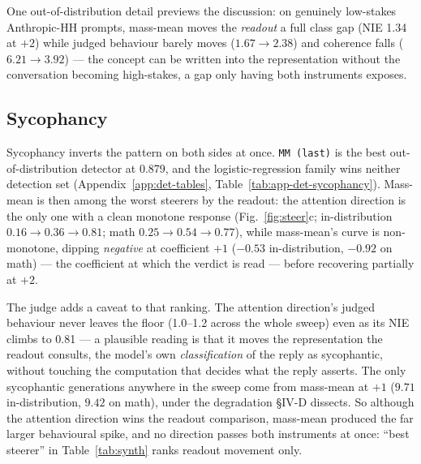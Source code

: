 \documentclass[conference]{IEEEtran}
\begin{document}
One out-of-distribution detail previews the discussion: on genuinely low-stakes
Anthropic-HH prompts, mass-mean moves the \emph{readout} a full class gap
(NIE 1.34 at $+2$) while judged behaviour barely moves ($1.67 \to 2.38$) and
coherence falls ($6.21 \to 3.92$) --- the concept can be written into the
representation without the conversation becoming high-stakes, a gap only having
both instruments exposes.

\subsection{Sycophancy}
Sycophancy inverts the pattern on both sides at once. \texttt{MM (last)} is the
best out-of-distribution detector at 0.879, and the logistic-regression family
wins neither detection set (Appendix~\ref{app:det-tables},
Table~\ref{tab:app-det-sycophancy}). Mass-mean is
then among the worst steerers by the
readout: the attention direction is the only one with a clean monotone response
(Fig.~\ref{fig:steer}c; in-distribution $0.16 \to 0.36 \to 0.81$; math
$0.25 \to 0.54 \to 0.77$), while
mass-mean's curve is non-monotone, dipping \emph{negative} at coefficient $+1$
($-0.53$ in-distribution, $-0.92$ on math) --- the coefficient at which the verdict
is read --- before recovering partially at $+2$.

The judge adds a caveat to that ranking. The attention direction's judged
behaviour never leaves the floor (1.0--1.2 across the whole sweep) even as its
NIE climbs to 0.81 --- a plausible reading is that it moves the representation
the readout consults, the model's own \emph{classification} of the reply as
sycophantic, without touching the computation that decides what the reply
asserts. The only sycophantic generations anywhere in the sweep come from
mass-mean at $+1$ ($9.71$ in-distribution, $9.42$ on math), under the
degradation §IV-D dissects. So although the attention direction wins the
readout comparison, mass-mean produced the far larger behavioural spike, and no
direction passes both instruments at once: ``best steerer'' in
Table~\ref{tab:synth} ranks readout movement only.
\end{document}
